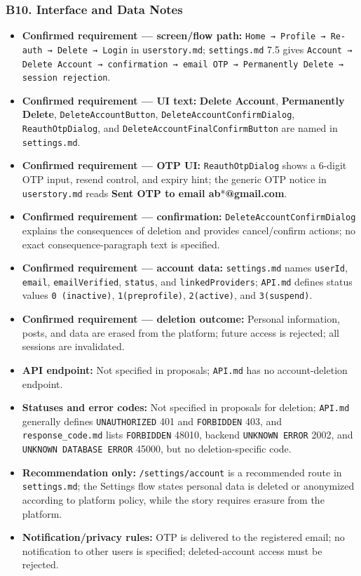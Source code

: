 \documentclass[12pt]{article}
\begin{document}
\hypertarget{sec:b10-interface-and-data-notes}{}
\subsubsection*{B10. Interface and Data Notes}
\par\medskip

\begin{itemize}
\item \textbf{Confirmed requirement --- screen/flow path:} \texttt{Home → Profile → Re-auth → Delete → Login} in \texttt{userstory.md}; \texttt{settings.md} 7.5 gives \texttt{Account → Delete Account → confirmation → email OTP → Permanently Delete → session rejection}.
\item \textbf{Confirmed requirement --- UI text:} \textbf{Delete Account}, \textbf{Permanently Delete}, \texttt{DeleteAccountButton}, \texttt{DeleteAccountConfirmDialog}, \texttt{ReauthOtpDialog}, and \texttt{DeleteAccountFinalConfirmButton} are named in \texttt{settings.md}.
\item \textbf{Confirmed requirement --- OTP UI:} \texttt{ReauthOtpDialog} shows a 6-digit OTP input, resend control, and expiry hint; the generic OTP notice in \texttt{userstory.md} reads \textbf{Sent OTP to email ab}*\textbf{@gmail.com}.
\item \textbf{Confirmed requirement --- confirmation:} \texttt{DeleteAccountConfirmDialog} explains the consequences of deletion and provides cancel/confirm actions; no exact consequence-paragraph text is specified.
\item \textbf{Confirmed requirement --- account data:} \texttt{settings.md} names \texttt{userId}, \texttt{email}, \texttt{emailVerified}, \texttt{status}, and \texttt{linkedProviders}; \texttt{API.md} defines status values \texttt{0 (inactive)}, \texttt{1(preprofile)}, \texttt{2(active)}, and \texttt{3(suspend)}.
\item \textbf{Confirmed requirement --- deletion outcome:} Personal information, posts, and data are erased from the platform; future access is rejected; all sessions are invalidated.
\item \textbf{API endpoint:} Not specified in proposals; \texttt{API.md} has no account-deletion endpoint.
\item \textbf{Statuses and error codes:} Not specified in proposals for deletion; \texttt{API.md} generally defines \texttt{UNAUTHORIZED} 401 and \texttt{FORBIDDEN} 403, and \texttt{response\_code.md} lists \texttt{FORBIDDEN} 48010, backend \texttt{UNKNOWN ERROR} 2002, and \texttt{UNKNOWN DATABASE ERROR} 45000, but no deletion-specific code.
\item \textbf{Recommendation only:} \texttt{/settings/account} is a recommended route in \texttt{settings.md}; the Settings flow states personal data is deleted or anonymized according to platform policy, while the story requires erasure from the platform.
\item \textbf{Notification/privacy rules:} OTP is delivered to the registered email; no notification to other users is specified; deleted-account access must be rejected.
\end{itemize}
\end{document}
